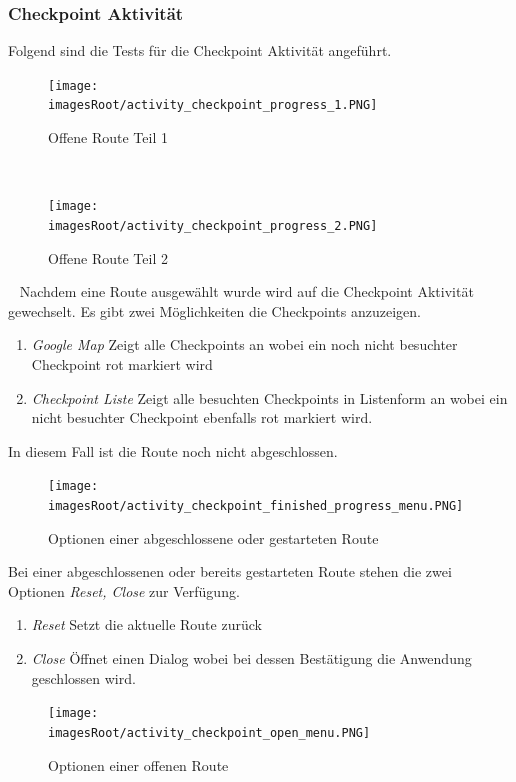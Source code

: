 \documentclass[11pt, a4paper, twoside]{article}   	%
\newcommand{\imagesRoot}{images}
\begin{document}
\subsubsection{Checkpoint Aktivität}
Folgend sind die Tests für die Checkpoint Aktivität angeführt.
\begin{figure}[h]
	\centering
	\texttt{[image: \\imagesRoot/activity\_checkpoint\_progress\_1.PNG]}
	\caption
	{Offene Route Teil 1}
\end{figure}
\ \newline
\begin{figure}[h]
	\centering
	\texttt{[image: \\imagesRoot/activity\_checkpoint\_progress\_2.PNG]}
	\caption
	{Offene Route Teil 2}
\end{figure}
\ \newline
Nachdem eine Route ausgewählt wurde wird auf die Checkpoint Aktivität gewechselt. Es gibt zwei Möglichkeiten die Checkpoints anzuzeigen.
\begin{enumerate}
	\item\emph{Google Map}
	\newline 
	Zeigt alle Checkpoints an wobei ein noch nicht besuchter Checkpoint rot markiert wird
	\item\emph{Checkpoint Liste}
	\newline 
	Zeigt alle besuchten Checkpoints in Listenform an wobei ein nicht besuchter Checkpoint ebenfalls rot markiert wird.
\end{enumerate}
In diesem Fall ist die Route noch nicht abgeschlossen.
\newpage
\begin{figure}[h]
	\centering
	\texttt{[image: \\imagesRoot/activity\_checkpoint\_finished\_progress\_menu.PNG]}
	\caption
	{Optionen einer abgeschlossene oder gestarteten Route}
\end{figure}
Bei einer abgeschlossenen oder bereits gestarteten Route stehen die zwei Optionen \emph{Reset, Close} zur Verfügung.
\begin{enumerate}
	\item\emph{Reset}
	\newline
	Setzt die aktuelle Route zurück
	\item\emph{Close}
	\newline
	Öffnet einen Dialog wobei bei dessen Bestätigung die Anwendung geschlossen wird.
\end{enumerate}
\begin{figure}[h]
	\centering
	\texttt{[image: \\imagesRoot/activity\_checkpoint\_open\_menu.PNG]}
	\caption
	{Optionen einer offenen Route}
\end{figure}
\end{document}
